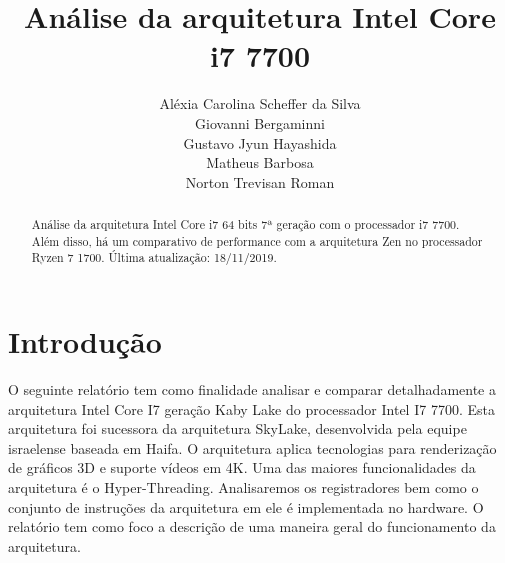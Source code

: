 \documentclass[12pt,a4paper,brazilian,utf8]{ppgsi}
\title{Análise da arquitetura Intel Core i7  7700}
\author{Aléxia Carolina Scheffer da Silva\inst{1}\\ Giovanni Bergaminni\inst{1}\\ Gustavo Jyun Hayashida\inst{1}\\ Matheus Barbosa\inst{1}\\ Norton Trevisan Roman\inst{1}}
\begin{document}
 \maketitle

\begin{abstract}
    Análise da arquitetura Intel Core i7 64 bits 7ª geração com o processador i7 7700. Além disso, há um comparativo de performance com a arquitetura Zen no processador Ryzen 7 1700. Última atualização: 18/11/2019.
\end{abstract}

\section{Introdução}
    O seguinte relatório tem como finalidade analisar e comparar detalhadamente a arquitetura Intel Core I7 geração Kaby Lake do processador Intel I7 7700. Esta arquitetura foi sucessora da arquitetura SkyLake, desenvolvida pela equipe israelense baseada em Haifa. O arquitetura aplica tecnologias para renderização de gráficos 3D e suporte vídeos em 4K. Uma das maiores funcionalidades da arquitetura é o Hyper-Threading. Analisaremos os registradores bem como o conjunto de instruções da arquitetura em ele é implementada no hardware. O relatório tem como foco a descrição de uma maneira geral do funcionamento da arquitetura.
 
\end{document}
